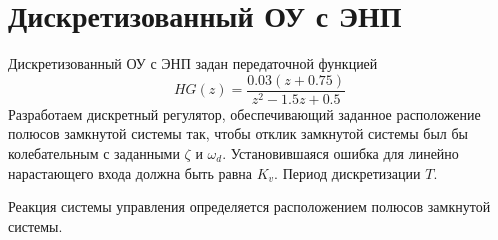\chapter{Дискретизованный ОУ с ЭНП}
\label{ch:chap3}
Дискретизованный ОУ с ЭНП задан передаточной функцией
\begin{equation}
	HG(z) = \frac{0.03(z+0.75)}{z^2 - 1.5 z + 0.5}
\end{equation}
Разработаем дискретный регулятор, обеспечивающий заданное расположение полюсов замкнутой системы так, чтобы отклик замкнутой системы был бы колебательным с заданными $\zeta$ и $\omega_d$. Установившаяся ошибка для линейно нарастающего входа должна быть равна $K_v$. Период дискретизации $T$.

Реакция системы управления определяется расположением полюсов замкнутой системы.

